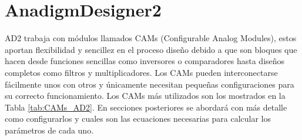 	\section{AnadigmDesigner2}
	
	AD2 trabaja con módulos llamados CAMs (Configurable Analog Modules), estos aportan flexibilidad y sencillez en el proceso diseño debido a que son bloques que hacen desde funciones sencillas como inversores o comparadores hasta diseños completos como filtros y multiplicadores. Los CAMs pueden interconectarse fácilmente unos con otros y únicamente necesitan pequeñas configuraciones para su correcto funcionamiento. Los CAMs más utilizados son los mostrados en la Tabla \ref{tab:CAMs_AD2}. En secciones posteriores se abordará con más detalle como configurarlos y cuales son las ecuaciones necesarias para calcular los parámetros de cada uno.  
	

